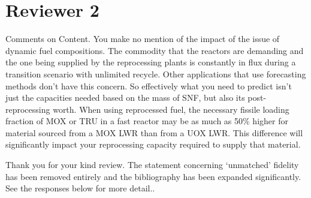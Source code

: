 \documentclass[answers,11pt]{exam}
\begin{document}
\section*{Reviewer 2}
\begin{questions}

\question Comments on Content.
You make no mention of the impact of the issue of dynamic fuel compositions. 
The commodity that the reactors are demanding and the one being supplied 
by the reprocessing plants is constantly in flux during a transition 
scenario with unlimited recycle. Other applications that use forecasting 
methods don't have this concern.  So effectively what you need to predict 
isn't just the capacities needed based on the mass of SNF, but also its 
post-reprocessing worth. When using reprocessed fuel, the necessary fissile 
loading fraction of MOX or TRU in a fast reactor may be as much as 50\% 
higher for material sourced from a MOX LWR than from a UOX LWR. 
This difference will significantly impact your reprocessing capacity 
required to supply that material.

\begin{solution}
        Thank you for your kind review.
        The statement concerning `unmatched' fidelity has been removed
        entirely and the bibliography has been expanded significantly. See the
        responses below for more detail..
\end{solution}

\question 


\end{questions}
\end{document}
